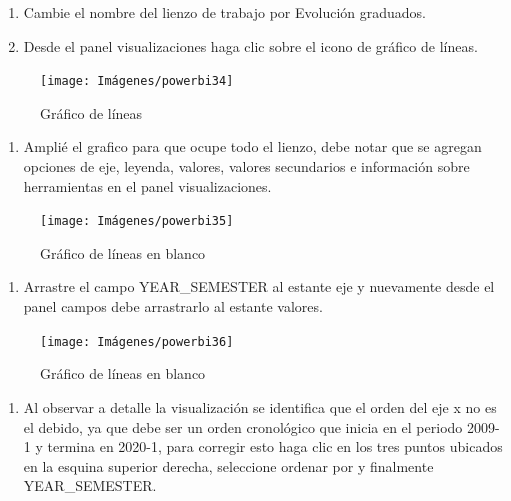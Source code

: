\documentclass[
]{book}
\providecommand{\tightlist}{%
  \setlength{\itemsep}{0pt}\setlength{\parskip}{0pt}}
\begin{document}
\begin{enumerate}
\def\labelenumi{\arabic{enumi}.}
\item
  Cambie el nombre del lienzo de trabajo por Evolución graduados.
\item
  Desde el panel visualizaciones haga clic sobre el icono de gráfico de líneas.
\end{enumerate}

\begin{figure}

{\centering \texttt{[image: Imágenes/powerbi34]} 

}

\caption{Gráfico de líneas}\label{fig:Agregargraficolineas-fig}
\end{figure}

\begin{enumerate}
\def\labelenumi{\arabic{enumi}.}
\setcounter{enumi}{2}
\tightlist
\item
  Amplié el grafico para que ocupe todo el lienzo, debe notar que se agregan opciones de eje, leyenda, valores, valores secundarios e información sobre herramientas en el panel visualizaciones.
\end{enumerate}

\begin{figure}

{\centering \texttt{[image: Imágenes/powerbi35]} 

}

\caption{Gráfico de líneas en blanco}\label{fig:paso3lineaspowerbi-fig}
\end{figure}

\begin{enumerate}
\def\labelenumi{\arabic{enumi}.}
\setcounter{enumi}{3}
\tightlist
\item
  Arrastre el campo YEAR\_SEMESTER al estante eje y nuevamente desde el panel campos debe arrastrarlo al estante valores.
\end{enumerate}

\begin{figure}

{\centering \texttt{[image: Imágenes/powerbi36]} 

}

\caption{Gráfico de líneas en blanco}\label{fig:paso4lineaspowerbi-fig}
\end{figure}

\begin{enumerate}
\def\labelenumi{\arabic{enumi}.}
\setcounter{enumi}{4}
\tightlist
\item
  Al observar a detalle la visualización se identifica que el orden del eje x no es el debido, ya que debe ser un orden cronológico que inicia en el periodo 2009-1 y termina en 2020-1, para corregir esto haga clic en los tres puntos ubicados en la esquina superior derecha, seleccione ordenar por y finalmente YEAR\_SEMESTER.
\end{enumerate}
\end{document}
